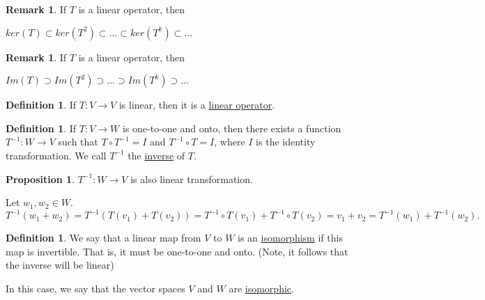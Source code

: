 \documentclass[a5paper]{article}
\makeatletter
\renewenvironment{proof}{{\bfseries Proof}}{\qed}
\renewenvironment{proof}[1][\bfseries \proofname]{\par
  \pushQED{\qed}%
  \normalfont \topsep6\p@\@plus6\p@\relax
  \trivlist
  \item[\hskip\labelsep
        \scshape
    #1\@addpunct{}]\ignorespaces
}{%
  \popQED\endtrivlist\@endpefalse
}
\theoremstyle{definition}%
\numberwithin{theorem}{section} %
\newtheorem{definition}[theorem]{Definition}
\newtheorem{proposition}[theorem]{Proposition}
\newtheorem{remark}[theorem]{Remark}
\makeatother
\begin{document}
\begin{remark}
If $T$ is a linear operator, then 

$ker(T) \subset	ker(T^2) \subset ... \subset ker(T^k) \subset ...$
\end{remark}

\begin{remark}
If $T$ is a linear operator, then 

$Im(T) \supset Im(T^2) \supset ... \supset Im(T^k) \supset ...$
\end{remark}

\begin{definition}
If $T: V \to V$ is linear, then it is a \underline{linear operator}. 
\end{definition}

\begin{definition}
If $T: V \to W$ is one-to-one and onto, then there exists a function $T^{-1}: W \to V$ such that $T \circ T^{-1} = I$ and $T^{-1} \circ T = I$, where $I$ is the identity transformation. We call $T^{-1}$ the \underline{inverse} of $T$. 
\end{definition}

\begin{proposition}
$T^{-1}: W \to V$ is also linear transformation. 
\begin{proof}
Let $w_1, w_2 \in W$. $T^{-1}(w_1 + w_2) = T^{-1}(T(v_1) + T(v_2)) = T^{-1} \circ T(v_1) + T^{-1} \circ T(v_2) = v_1 + v_2 = T^{-1}(w_1) + T^{-1}(w_2). $
\end{proof}
\end{proposition}

\begin{definition}
We say that a linear map from $V$ to $W$ is an \underline{isomorphism} if this map is invertible. That is, it must be one-to-one and onto. (Note, it follows that the inverse will be linear)

In this case, we say that the vector spaces $V$ and $W$ are \underline{isomorphic}.
\end{definition}
\end{document}
